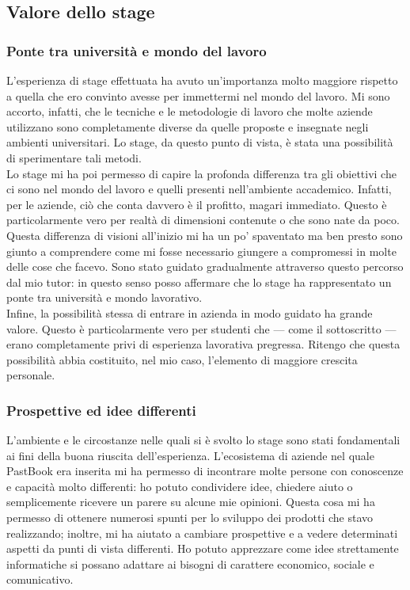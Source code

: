 		\subsection{Valore dello stage}
			\subsubsection{Ponte tra università e mondo del lavoro}
				L'esperienza di stage effettuata ha avuto un'importanza molto maggiore rispetto a quella che ero convinto avesse per
				immettermi nel mondo del lavoro. Mi sono accorto, infatti, che le tecniche e le metodologie di lavoro che molte
				aziende utilizzano sono completamente diverse da quelle proposte e insegnate negli ambienti universitari. Lo stage,
				da questo punto di vista, è stata una possibilità di sperimentare tali metodi.\\
				Lo stage mi ha poi permesso di capire la profonda differenza tra gli obiettivi che ci sono nel mondo del lavoro e
				quelli presenti nell'ambiente accademico. Infatti, per le aziende, ciò che conta davvero è il profitto, magari
				immediato. Questo è particolarmente vero per realtà di dimensioni contenute o che sono nate da poco. Questa
				differenza di visioni all'inizio mi ha un po' spaventato ma ben presto sono giunto a comprendere come mi fosse
				necessario giungere a compromessi in molte delle cose che facevo. Sono stato guidato gradualmente attraverso questo
				percorso dal mio tutor: in questo senso posso affermare che lo stage ha rappresentato un ponte tra università e
				mondo lavorativo.\\
				Infine, la possibilità stessa di entrare in azienda in modo guidato ha grande valore. Questo è particolarmente vero
				per studenti che — come il sottoscritto — erano completamente privi di esperienza lavorativa pregressa. Ritengo che
				questa possibilità abbia costituito, nel mio caso, l'elemento di maggiore crescita personale.
			\subsubsection{Prospettive ed idee differenti}
				L'ambiente e le circostanze nelle quali si è svolto lo stage sono stati fondamentali ai fini della buona riuscita
				dell'esperienza. L'ecosistema di aziende nel quale PastBook era inserita mi ha permesso di incontrare molte persone
				con conoscenze e capacità molto differenti: ho potuto condividere idee, chiedere aiuto o semplicemente ricevere un
				parere su alcune mie opinioni. Questa cosa mi ha permesso di ottenere numerosi spunti per lo sviluppo dei
				prodotti che stavo realizzando; inoltre, mi ha aiutato a cambiare prospettive e a vedere determinati aspetti da
				punti di vista differenti. Ho potuto apprezzare come idee strettamente informatiche si possano adattare ai bisogni
				di carattere economico, sociale e comunicativo.
